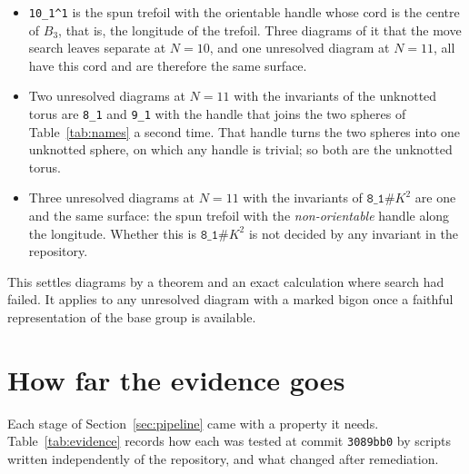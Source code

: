 \documentclass[11pt]{amsart}
\newcommand{\lab}[1]{\texttt{#1}}
\theoremstyle{plain}
\theoremstyle{remark}
\begin{document}
\begin{itemize}[leftmargin=*]
\item \lab{10\_1\^{}1} is the spun trefoil with the orientable handle whose cord is the centre of $B_3$,
that is, the longitude of the trefoil. Three diagrams of it that the move search leaves separate at
$N=10$, and one unresolved diagram at $N=11$, all have this cord and are therefore the same surface.
\item Two unresolved diagrams at $N=11$ with the invariants of the unknotted torus are \lab{8\_1} and
\lab{9\_1} with the handle that joins the two spheres of Table~\ref{tab:names} a second time. That handle
turns the two spheres into one unknotted sphere, on which any handle is trivial; so both are the
unknotted torus.
\item Three unresolved diagrams at $N=11$ with the invariants of $\lab{8\_1}\#K^2$ are one and the same
surface: the spun trefoil with the \emph{non-orientable} handle along the longitude. Whether this is
$\lab{8\_1}\#K^2$ is not decided by any invariant in the repository.
\end{itemize}

This settles diagrams by a theorem and an exact calculation where search had failed. It applies to any
unresolved diagram with a marked bigon once a faithful representation of the base group is available.

\section{How far the evidence goes}\label{sec:evidence}

Each stage of Section~\ref{sec:pipeline} came with a property it needs. Table~\ref{tab:evidence} records
how each was tested at commit \texttt{3089bb0} by scripts written independently of the repository, and what
changed after remediation.
\end{document}

